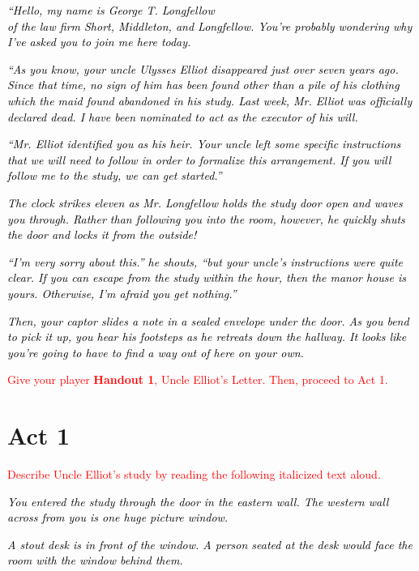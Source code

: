 \documentclass[a6paper, parskip=half, DIV=14, 12pt]{scrartcl}
\begin{document}
\textcolor{black}{\textit{``Hello, my name is George T. Longfellow\\of the law firm Short, Middleton, and Longfellow. You're probably wondering why I've asked you to join me here today.}}

\textcolor{black}{\textit{``As you know, your uncle Ulysses Elliot disappeared just over seven years ago. Since that time, no sign of him has been found other than a pile of his clothing which the maid found abandoned in his study. Last week, Mr. Elliot was officially declared dead. I have been nominated to act as the executor of his will.}}

\textcolor{black}{\textit{``Mr. Elliot identified you as his heir. Your uncle left some specific instructions that we will need to follow in order to formalize this arrangement. If you will follow me to the study, we can get started.''}}

\newpage

\textcolor{black}{\textit{The clock strikes eleven as Mr. Longfellow holds the study door open and waves you through. Rather than following you into the room, however, he quickly shuts the door and locks it from the outside!}}

\textcolor{black}{\textit{``I'm very sorry about this.'' he shouts, ``but your uncle's instructions were quite clear. If you can escape from the study within the hour, then the manor house is yours. Otherwise, I'm afraid you get nothing.''}}

\textcolor{black}{\textit{Then, your captor slides a note in a sealed envelope under the door. As you bend to pick it up, you hear his footsteps as he retreats down the hallway. It looks like you're going to have to find a way out of here on your own.}}

\textcolor{Red}{Give your player \textbf{Handout 1}, Uncle Elliot's Letter. Then, proceed to Act 1.}

\newpage

\section*{Act 1}
\textcolor{Red}{Describe Uncle Elliot's study by reading the following italicized text aloud.}

\textcolor{black}{\textit{You entered the study through the door in the eastern wall. The western wall across from you is one huge picture window.}}

\textcolor{black}{\textit{A stout desk is in front of the window. A person seated at the desk would face the room with the window behind them.}}
\end{document}
